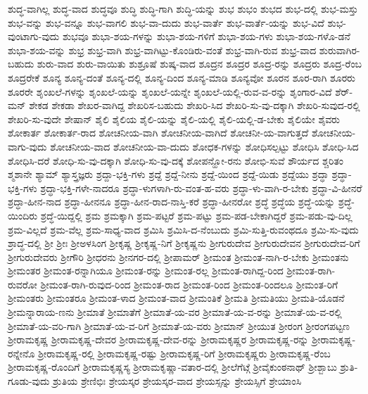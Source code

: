 {ಶುದ್ಧ-ವಾಗಿಲ್ಲ
ಶುದ್ಧ-ವಾದ
ಶುದ್ಧವೂ
ಶುದ್ಧಿ
ಶುದ್ಧಿ-ಗಾಗಿ
ಶುದ್ಧಿ-ಯನ್ನು
ಶುಭ
ಶುಭಂ
ಶುಭದ
ಶುಭ-ದಲ್ಲಿ
ಶುಭ-ಮಸ್ತು
ಶುಭ-ವನ್ನು
ಶುಭ-ವನ್ನೂ
ಶುಭ-ವಾಗಲಿ
ಶುಭ-ವಾ-ದುದು
ಶುಭ-ವಾರ್ತೆ
ಶುಭ-ವಾರ್ತೆ-ಯನ್ನು
ಶುಭ-ವಿದೆ
ಶುಭ-ವುಂಟಾಗು-ವುದು
ಶುಭವೂ
ಶುಭಾ-ಶಯ-ಗಳನ್ನು
ಶುಭಾ-ಶಯ-ಗಳಿಗೆ
ಶುಭಾ-ಶಯ-ಗಳು
ಶುಭಾ-ಶಯ-ಗಳೊ-ಡನೆ
ಶುಭಾ-ಶಯ-ವನ್ನು
ಶುಭ್ರ
ಶುಭ್ರ-ವಾಗಿ
ಶುಭ್ರ-ವಾಗಿಟ್ಟು-ಕೊಂಡಿರು-ವಂತೆ
ಶುಭ್ರ-ವಾಗಿ-ರುವ
ಶುಭ್ರ-ವಾದ
ಶುರುವಾಗಿರ-ಬಹುದು
ಶುರು-ವಾದ
ಶುರು-ವಾಯಿತು
ಶುಶ್ರೂಷೆ
ಶುಷ್ಕ-ವಾದ
ಶೂದ್ರನ
ಶೂದ್ರರ
ಶೂದ್ರ-ರನ್ನು
ಶೂದ್ರರು
ಶೂದ್ರ-ರೆಂಬ
ಶೂದ್ರರೇಕೆ
ಶೂನ್ಯ
ಶೂನ್ಯ-ದಂತೆ
ಶೂನ್ಯ-ದಲ್ಲಿ
ಶೂನ್ಯ-ದಿಂದ
ಶೂನ್ಯ-ಮಾಡಿ
ಶೂನ್ಯವೋ
ಶೂರನ
ಶೂರ-ರಾಗಿ
ಶೂರರು
ಶೂರರೇ
ಶೃಂಖಲೆ-ಗಳನ್ನು
ಶೃಂಖಲೆ-ಯನ್ನು
ಶೃಂಖಲೆ-ಯನ್ನೇ
ಶೃಂಖಲೆ-ಯಲ್ಲಿ-ರುವ-ವ-ರನ್ನು
ಶೃಂಗಾರ-ವಿದೆ
ಶೆರ್-ಮನ್
ಶೇಕಡ
ಶೇಕಡಾ
ಶೇಖರ-ವಾಗಿದ್ದ
ಶೇಖರಿಸ-ಬಹುದು
ಶೇಖರಿ-ಸಿದ
ಶೇಖರಿ-ಸು-ವು-ದಕ್ಕಾಗಿ
ಶೇಖರಿ-ಸುವುದ-ರಲ್ಲಿ
ಶೇಖರಿ-ಸು-ವುದೇ
ಶೇಷಾನ್
ಶೈಲಿ
ಶೈಲಿಯ
ಶೈಲಿ-ಯನ್ನು
ಶೈಲಿ-ಯಲ್ಲಿ
ಶೈಲಿ-ಯಲ್ಲಿ-ಡ-ಬೇಕು
ಶೈಲಿಯೇ
ಶೈವರು
ಶೋಕಾರ್ತ
ಶೋಕಾರ್ತ-ರಾದ
ಶೋಚನೀಯ-ವಾಗಿ
ಶೋಚನೀಯ-ವಾಗಿದೆ
ಶೋಚನೀ-ಯ-ವಾಗುತ್ತದೆ
ಶೋಚನೀಯ-ವಾಗು-ವುದು
ಶೋಚನೀಯ-ವಾದ
ಶೋಚನೀಯ-ವಾ-ದುದು
ಶೋಧಕ-ಗಳನ್ನು
ಶೋಧಿಸಲ್ಪಟ್ಟು
ಶೋಧಿಸಿ
ಶೋಧಿ-ಸಿದ
ಶೋಧಿಸಿ-ದರೆ
ಶೋಧಿ-ಸು-ವು-ದಕ್ಕಾಗಿ
ಶೋಧಿ-ಸು-ವು-ದಕ್ಕೆ
ಶೋಪನ್ಹೋ-ರನು
ಶೋಭಿ-ಸುವೆ
ಶೌರ್ಯದ
ಶ್ಚರಿತಂ
ಶ್ಮಶಾನೇ
ಶ್ಯಾಮ್
ಶ್ಯಾಸ್ತ್ರಜ್ಞರು
ಶ್ರದ್ದಾ-ಭಕ್ತಿ-ಗಳು
ಶ್ರದ್ದೆ
ಶ್ರದ್ದೆ-ನೀನು
ಶ್ರದ್ದೆ-ಯಿಂದ
ಶ್ರದ್ದೆ-ಯಿಡು
ಶ್ರದ್ದೆಯು
ಶ್ರದ್ಧಾ
ಶ್ರದ್ಧಾ-ಭಕ್ತಿ-ಗಳು
ಶ್ರದ್ಧಾ-ಭಕ್ತಿ-ಗಳೇ-ನಾದರೂ
ಶ್ರದ್ಧಾ-ಳುಗಳಾಗಿ-ರು-ವಂತ-ಹ-ವರು
ಶ್ರದ್ಧಾ-ಳು-ವಾಗಿ-ರ-ಬೇಕು
ಶ್ರದ್ಧಾ-ವಿ-ಹೀನರೆ
ಶ್ರದ್ಧಾ-ಹೀನ-ನಾದ
ಶ್ರದ್ಧಾ-ಹೀನನೂ
ಶ್ರದ್ಧಾ-ಹೀನ-ರಾದ-ನಾಸ್ತಿ-ಕರೆ
ಶ್ರದ್ಧಾ-ಹೀನರೋ
ಶ್ರದ್ಧೆ
ಶ್ರದ್ಧೆಯ
ಶ್ರದ್ಧೆ-ಯನ್ನು
ಶ್ರದ್ಧೆ-ಯಿಂದಿರು
ಶ್ರದ್ಧೆ-ಯಿದ್ದಲ್ಲಿ
ಶ್ರಮ
ಶ್ರಮಕ್ಕಾಗಿ
ಶ್ರಮ-ಪಟ್ಟರೆ
ಶ್ರಮ-ಪಟ್ಟು
ಶ್ರಮ-ಪಡ-ಬೇಕಾಗಿದ್ದರೆ
ಶ್ರಮ-ಪಡು-ವು-ದಿಲ್ಲ
ಶ್ರಮ-ವಿಲ್ಲದೆ
ಶ್ರಮ-ವೆಲ್ಲ
ಶ್ರಮ-ಸಾಧ್ಯ-ವಾದ
ಶ್ರಮಿಸಿ
ಶ್ರಮಿಸಿ-ದ-ನೆಂಬುದು
ಶ್ರಮಿ-ಸುತ್ತಿ-ರುವಂಥದೂ
ಶ್ರಮಿ-ಸು-ವುದು
ಶ್ರಾದ್ಧ-ದಲ್ಲಿ
ಶ್ರೀ
ಶ್ರೀಃ
ಶ್ರೀಅಳಸಿಂಗ
ಶ್ರೀಕೃಷ್ಣ
ಶ್ರೀಕೃಷ್ಣ-ನಿಗೆ
ಶ್ರೀಕೃಷ್ಣನು
ಶ್ರೀಗುರುದೇವ
ಶ್ರೀಗುರುದೇವನ
ಶ್ರೀಗುರುದೇವ-ರಿಗೆ
ಶ್ರೀಗುರುದೇವರು
ಶ್ರೀಗೌರಿ
ಶ್ರೀಧರನು
ಶ್ರೀನಗರ-ದಲ್ಲಿ
ಶ್ರೀಪಾಮರ್
ಶ್ರೀಮಂತ
ಶ್ರೀಮಂತ-ನಾಗಿ-ರ-ಬೇಕು
ಶ್ರೀಮಂತನು
ಶ್ರೀಮಂತರ
ಶ್ರೀಮಂತ-ರನ್ನಾಗಿಯೂ
ಶ್ರೀಮಂತ-ರನ್ನು
ಶ್ರೀಮಂತ-ರಲ್ಲ
ಶ್ರೀಮಂತ-ರಾಗಿದ್ದ-ರಿಂದ
ಶ್ರೀಮಂತ-ರಾಗಿ-ರುವರೋ
ಶ್ರೀಮಂತ-ರಾಗಿ-ರುವುದ-ರಿಂದ
ಶ್ರೀಮಂತ-ರಾದ
ಶ್ರೀಮಂತ-ರಿಂದ
ಶ್ರೀಮಂತ-ರಿಂದಲೂ
ಶ್ರೀಮಂತ-ರಿಗೆ
ಶ್ರೀಮಂತರು
ಶ್ರೀಮಂತರೂ
ಶ್ರೀಮಂತ-ಳಾದ
ಶ್ರೀಮಂತ-ವಾದ
ಶ್ರೀಮಂತಿಕೆ
ಶ್ರೀಮತಿ
ಶ್ರೀಮತಿಯು
ಶ್ರೀಮತಿ-ಯೊಡನೆ
ಶ್ರೀಮನ್ನಾರಾಯ-ಣನು
ಶ್ರೀಮಾತೆ
ಶ್ರೀಮಾತೆಗೆ
ಶ್ರೀಮಾತೆ-ಯ-ವರ
ಶ್ರೀಮಾತೆ-ಯ-ವ-ರನ್ನು
ಶ್ರೀಮಾತೆ-ಯ-ವ-ರಲ್ಲಿ
ಶ್ರೀಮಾತೆ-ಯ-ವರಿ-ಗಾಗಿ
ಶ್ರೀಮಾತೆ-ಯ-ವ-ರಿಗೆ
ಶ್ರೀಮಾತೆ-ಯ-ವರು
ಶ್ರೀಮಾನ್
ಶ್ರೀಯುತ
ಶ್ರೀರಂಗ
ಶ್ರೀರಂಗಪಟ್ಟಣ
ಶ್ರೀರಾಮಕೃಷ್ಣ
ಶ್ರೀರಾಮಕೃಷ್ಣ-ದೇವರ
ಶ್ರೀರಾಮಕೃಷ್ಣ-ದೇವ-ರನ್ನು
ಶ್ರೀರಾಮಕೃಷ್ಣರ
ಶ್ರೀರಾಮಕೃಷ್ಣ-ರನ್ನು
ಶ್ರೀರಾಮಕೃಷ್ಣ-ರನ್ನೇನೊ
ಶ್ರೀರಾಮಕೃಷ್ಣ-ರಲ್ಲಿ
ಶ್ರೀರಾಮಕೃಷ್ಣ-ರಷ್ಟು
ಶ್ರೀರಾಮಕೃಷ್ಣ-ರಿಗೆ
ಶ್ರೀರಾಮಕೃಷ್ಣರು
ಶ್ರೀರಾಮಕೃಷ್ಣ-ರೆಂಬ
ಶ್ರೀರಾಮಕೃಷ್ಣ-ರೊಂದಿಗೆ
ಶ್ರೀರಾಮಕೃಷ್ಣಸ್ಯ
ಶ್ರೀರಾಮಕೃಷ್ಣಾ-ವತಾರ-ದಲ್ಲಿ
ಶ್ರೀಲೆಗೆಟ್ಗೆ
ಶ್ರೀವೈಕುಂಠನಾಥ್
ಶ್ರೀಶ್ಬಾಬು
ಶ್ರುತಿ-ಗೂಡು-ವುದು
ಶ್ರುತಿಯ
ಶ್ರೇಣಿಭಿಃ
ಶ್ರೇಯಸ್ಕರ
ಶ್ರೇಯಸ್ಕರ-ವಾದ
ಶ್ರೇಯಸ್ಸನ್ನು
ಶ್ರೇಯಸ್ಸಿಗೆ
ಶ್ರೇಯಾಂಸಿ
}
